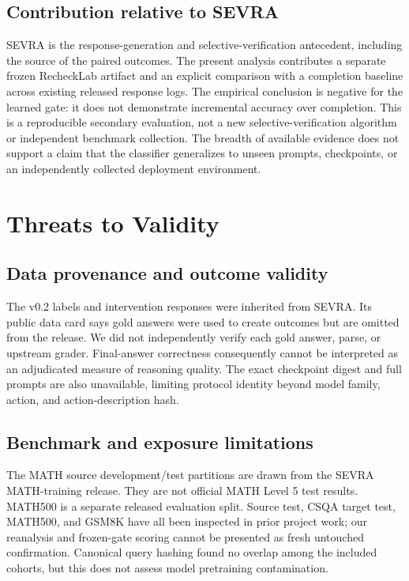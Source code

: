 \documentclass[conference]{IEEEtran}
\begin{document}
\subsection{Contribution relative to SEVRA}
SEVRA is the response-generation and selective-verification antecedent, including the source of the paired outcomes. The present analysis contributes a separate frozen RecheckLab artifact and an explicit comparison with a completion baseline across existing released response logs. The empirical conclusion is negative for the learned gate: it does not demonstrate incremental accuracy over completion. This is a reproducible secondary evaluation, not a new selective-verification algorithm or independent benchmark collection. The breadth of available evidence does not support a claim that the classifier generalizes to unseen prompts, checkpoints, or an independently collected deployment environment.

\section{Threats to Validity}
\subsection{Data provenance and outcome validity}
The v0.2 labels and intervention responses were inherited from SEVRA. Its public data card says gold answers were used to create outcomes but are omitted from the release. We did not independently verify each gold answer, parse, or upstream grader. Final-answer correctness consequently cannot be interpreted as an adjudicated measure of reasoning quality. The exact checkpoint digest and full prompts are also unavailable, limiting protocol identity beyond model family, action, and action-description hash.

\subsection{Benchmark and exposure limitations}
The MATH source development/test partitions are drawn from the SEVRA MATH-training release. They are not official MATH Level 5 test results. MATH500 is a separate released evaluation split. Source test, CSQA target test, MATH500, and GSM8K have all been inspected in prior project work; our reanalysis and frozen-gate scoring cannot be presented as fresh untouched confirmation. Canonical query hashing found no overlap among the included cohorts, but this does not assess model pretraining contamination.
\end{document}
